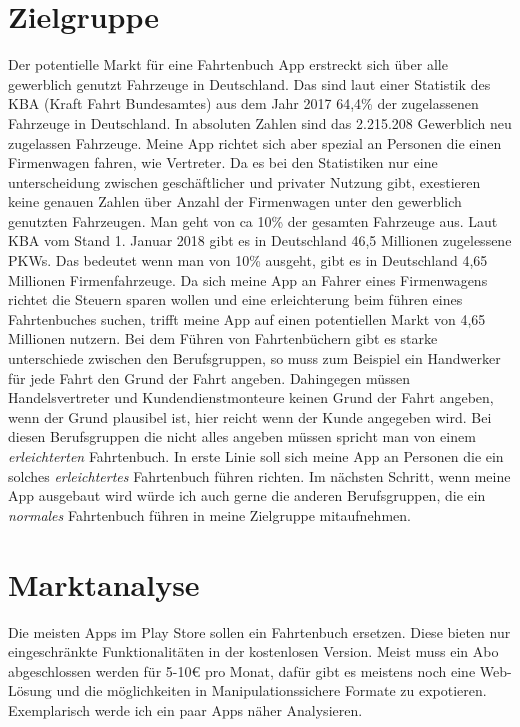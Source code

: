 \documentclass[a4paper]{article}
\begin{document}
\section{Zielgruppe}
Der potentielle Markt für eine Fahrtenbuch App erstreckt sich über alle
gewerblich genutzt Fahrzeuge in Deutschland. Das sind laut einer Statistik des KBA (Kraft Fahrt Bundesamtes)
aus dem Jahr 2017 64,4\% der zugelassenen Fahrzeuge in Deutschland. In absoluten Zahlen sind das 2.215.208
Gewerblich neu zugelassen Fahrzeuge. Meine App richtet sich aber spezial an Personen die einen
Firmenwagen fahren, wie Vertreter. Da es bei den Statistiken nur eine unterscheidung zwischen
geschäftlicher und privater Nutzung gibt, exestieren keine genauen Zahlen über Anzahl der Firmenwagen
unter den gewerblich genutzten Fahrzeugen. Man geht von ca 10\% der gesamten Fahrzeuge aus.
Laut KBA vom Stand 1. Januar 2018 gibt es in Deutschland 46,5 Millionen zugelessene PKWs.
Das bedeutet wenn man von 10\% ausgeht, gibt es in Deutschland 4,65 Millionen Firmenfahrzeuge.
Da sich meine App an Fahrer eines Firmenwagens richtet die Steuern sparen wollen und eine
erleichterung beim führen eines Fahrtenbuches suchen, trifft meine App auf einen potentiellen
Markt von 4,65 Millionen nutzern. Bei dem Führen von Fahrtenbüchern gibt es starke unterschiede
zwischen den Berufsgruppen, so muss zum Beispiel ein Handwerker für jede Fahrt den Grund der Fahrt angeben.
Dahingegen müssen Handelsvertreter und Kundendienstmonteure keinen Grund der Fahrt angeben, wenn der Grund
plausibel ist, hier reicht wenn der Kunde angegeben wird. Bei diesen Berufsgruppen die nicht alles angeben
müssen spricht man von einem \textit{erleichterten} Fahrtenbuch. In erste Linie soll sich meine App an Personen
die ein solches \textit{erleichtertes} Fahrtenbuch führen richten. Im nächsten Schritt, wenn meine App ausgebaut wird
würde ich auch gerne die anderen Berufsgruppen, die ein \textit{normales} Fahrtenbuch führen in
meine Zielgruppe mitaufnehmen.


\section{Marktanalyse}
Die meisten Apps im Play Store sollen ein Fahrtenbuch ersetzen. Diese bieten nur eingeschränkte
Funktionalitäten in der kostenlosen Version. Meist muss ein Abo abgeschlossen werden für 5-10€ pro Monat,
dafür gibt es meistens noch eine Web-Lösung und die möglichkeiten in Manipulationssichere Formate
zu expotieren. Exemplarisch werde ich ein paar Apps näher Analysieren.
\end{document}
